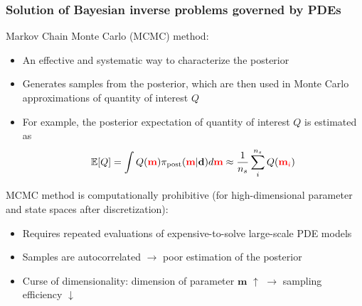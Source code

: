 \documentclass{beamer}
\begin{document}
\begin{frame}
  \frametitle{Solution of Bayesian inverse problems governed by PDEs}

  \begin{block}{Markov Chain Monte Carlo (MCMC) method:}
    \begin{itemize}
      \item An effective and systematic way to characterize the posterior
      \item Generates samples from the posterior, which are then used in Monte
        Carlo approximations of quantity of interest $Q$
      \item For example, the posterior expectation of quantity of interest $Q$ is estimated as
        \vspace{-0.5cm}
        $$
          \mathbb{E}[Q] = \int Q(\mathbf{\textcolor{red}{m}}) \pi_\text{post} (\mathbf{\textcolor{red}{m}} |
          \mathbf{d}) d \mathbf{\textcolor{red}{m}}
          \approx \frac{1}{n_s} \sum_{i}^{n_s} Q(\textcolor{red}{\mathbf{m}_i})
        $$
    \end{itemize}
  \end{block}

  \begin{block}{MCMC method is computationally prohibitive (for
    high-dimensional parameter and state spaces after discretization):}
    \begin{itemize}
      \item Requires repeated evaluations of expensive-to-solve large-scale PDE models
      \item Samples are autocorrelated $\rightarrow$ poor estimation of the
        posterior
      \item Curse of dimensionality: dimension of parameter $\mathbf{m}$ $\uparrow$
        $\rightarrow$ sampling efficiency $\downarrow$
    \end{itemize}
  \end{block}
\end{frame}
\end{document}
